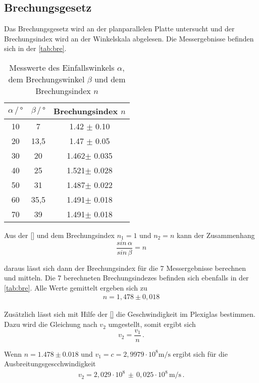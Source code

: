 \subsection{Brechungsgesetz}
Das Brechungsgesetz wird an der planparallelen Platte untersucht und der Brechungsindex wird an der Winkelskala abgelesen. Die Messergebnisse befinden sich in der \autoref{tab:bre}. 
\begin{table}
    \centering
    \caption{Messwerte des Einfallswinkels $\alpha$, dem Brechungswinkel $\beta$ und dem Brechungsindex $n$}
    \label{tab:bre}
    \begin{tabular}{c c c}
    \toprule
         $\alpha \, / \, ° $ & $\beta \, / \, °$ & Brechungsindex $n$\\
    \midrule
    10 & 7    & 1.42 $\pm$ 0.10\\
    20 & 13,5 & 1.47 $\pm$ 0.05\\
    30 & 20   & 1.462$\pm$ 0.035\\
    40 & 25   & 1.521$\pm$ 0.028\\
    50 & 31   & 1.487$\pm$ 0.022\\
    60 & 35,5 & 1.491$\pm$ 0.018\\
    70 & 39   & 1.491$\pm$ 0.018\\
    \bottomrule
    \end{tabular}
\end{table}

\noindent
Aus der \autoref{} und dem Brechungsindex $n_1 = 1$ und $n_2 = n$ kann der Zusammenhang 
\begin{equation}
    \frac{sin \, \alpha}{sin \, \beta} = n
\end{equation}

\noindent
daraus lässt sich dann der Brechungsindex für die 7 Messergebnisse berechnen und mitteln. Die 7 berechneten Brechungsindezes befinden sich ebenfalls in der \autoref{tab:bre}.
Alle Werte gemittelt ergeben sich zu 
\begin{align*}
    n = 1,478 \pm 0,018
\end{align*} 

Zusätzlich lässt sich mit Hilfe der \autoref{} die Geschwindigkeit im Plexiglas bestimmen. Dazu wird die Gleichung nach $v_2$ umgestellt, somit ergibt sich
\begin{equation}
    v_2 = \frac{v_1}{n} \, .
\end{equation}

\noindent
Wenn $n = 1.478 \pm 0.018$ und $v_1 = c = 2,9979 \cdot 10^8 \si{\meter\per\second}$ ergibt sich für die Ausbreitungsgescchwindigkeit
\begin{align*}
    v_2 = 2,029 \cdot 10^8 \, \pm \, 0,025 \cdot 10^8 \, \si{\meter\per\second} \, .
\end{align*}

